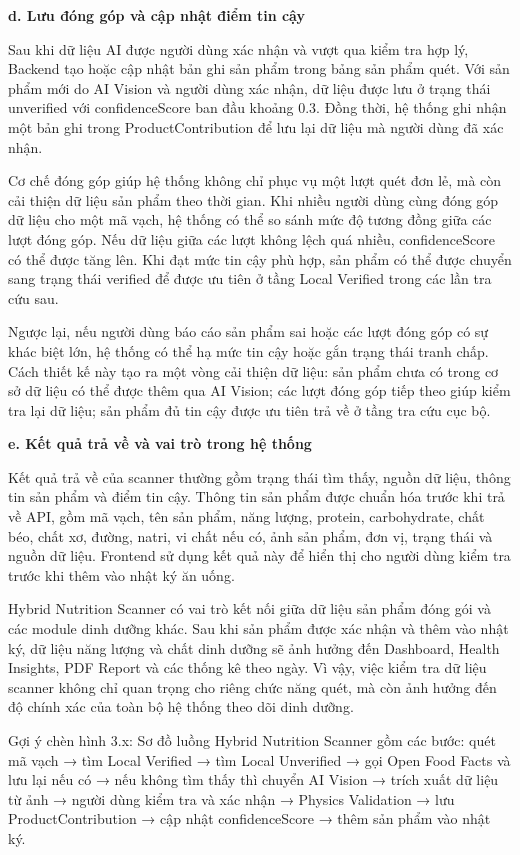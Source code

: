 \documentclass[12pt, a4paper]{report}
\begin{document}
\textbf{d. Lưu đóng góp và cập nhật điểm tin cậy}

Sau khi dữ liệu AI được người dùng xác nhận và vượt qua kiểm tra hợp lý, Backend tạo hoặc cập nhật bản ghi sản phẩm trong bảng sản phẩm quét. Với sản phẩm mới do AI Vision và người dùng xác nhận, dữ liệu được lưu ở trạng thái unverified với confidenceScore ban đầu khoảng 0.3. Đồng thời, hệ thống ghi nhận một bản ghi trong ProductContribution để lưu lại dữ liệu mà người dùng đã xác nhận.

Cơ chế đóng góp giúp hệ thống không chỉ phục vụ một lượt quét đơn lẻ, mà còn cải thiện dữ liệu sản phẩm theo thời gian. Khi nhiều người dùng cùng đóng góp dữ liệu cho một mã vạch, hệ thống có thể so sánh mức độ tương đồng giữa các lượt đóng góp. Nếu dữ liệu giữa các lượt không lệch quá nhiều, confidenceScore có thể được tăng lên. Khi đạt mức tin cậy phù hợp, sản phẩm có thể được chuyển sang trạng thái verified để được ưu tiên ở tầng Local Verified trong các lần tra cứu sau.

Ngược lại, nếu người dùng báo cáo sản phẩm sai hoặc các lượt đóng góp có sự khác biệt lớn, hệ thống có thể hạ mức tin cậy hoặc gắn trạng thái tranh chấp. Cách thiết kế này tạo ra một vòng cải thiện dữ liệu: sản phẩm chưa có trong cơ sở dữ liệu có thể được thêm qua AI Vision; các lượt đóng góp tiếp theo giúp kiểm tra lại dữ liệu; sản phẩm đủ tin cậy được ưu tiên trả về ở tầng tra cứu cục bộ.

\textbf{e. Kết quả trả về và vai trò trong hệ thống}

Kết quả trả về của scanner thường gồm trạng thái tìm thấy, nguồn dữ liệu, thông tin sản phẩm và điểm tin cậy. Thông tin sản phẩm được chuẩn hóa trước khi trả về API, gồm mã vạch, tên sản phẩm, năng lượng, protein, carbohydrate, chất béo, chất xơ, đường, natri, vi chất nếu có, ảnh sản phẩm, đơn vị, trạng thái và nguồn dữ liệu. Frontend sử dụng kết quả này để hiển thị cho người dùng kiểm tra trước khi thêm vào nhật ký ăn uống.

Hybrid Nutrition Scanner có vai trò kết nối giữa dữ liệu sản phẩm đóng gói và các module dinh dưỡng khác. Sau khi sản phẩm được xác nhận và thêm vào nhật ký, dữ liệu năng lượng và chất dinh dưỡng sẽ ảnh hưởng đến Dashboard, Health Insights, PDF Report và các thống kê theo ngày. Vì vậy, việc kiểm tra dữ liệu scanner không chỉ quan trọng cho riêng chức năng quét, mà còn ảnh hưởng đến độ chính xác của toàn bộ hệ thống theo dõi dinh dưỡng.

Gợi ý chèn hình 3.x: Sơ đồ luồng Hybrid Nutrition Scanner gồm các bước: quét mã vạch → tìm Local Verified → tìm Local Unverified → gọi Open Food Facts và lưu lại nếu có → nếu không tìm thấy thì chuyển AI Vision → trích xuất dữ liệu từ ảnh → người dùng kiểm tra và xác nhận → Physics Validation → lưu ProductContribution → cập nhật confidenceScore → thêm sản phẩm vào nhật ký.
\end{document}
